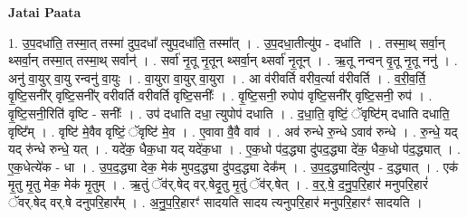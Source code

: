 \documentclass[17pt]{extarticle}
\begin{document}
\textbf{Jatai Paata} \newline

1. उ॒प॒दधा॑ति॒ तस्मा॒त् तस्मा॑ दुप॒दधा᳚ त्युप॒दधा॑ति॒ तस्मा᳚त् । . उ॒प॒दधा॒तीत्यु॑प - दधा॑ति । . तस्मा॒थ् सर्वा॒न् थ्सर्वा॒न् तस्मा॒त् तस्मा॒थ् सर्वान्॑ । . सर्वा॑ नृ॒तू नृ॒तून् थ्सर्वा॒न् थ्सर्वा॑ नृ॒तून् । . ऋ॒तू नन्वन् वृ॒तू नृ॒तू ननु॑ । . अनु॑ वा॒युर् वा॒यु रन्वनु॑ वा॒युः । . वा॒युरा वा॒युर् वा॒युरा । . आ व॑रीवर्ति वरीव॒र्त्या व॑रीवर्ति । . व॒री॒व॒र्ति॒ वृ॒ष्टि॒सनी᳚र् वृष्टि॒सनी᳚र् वरीवर्ति वरीवर्ति वृष्टि॒सनीः᳚ । . वृ॒ष्टि॒सनी॒ रुपोप॑ वृष्टि॒सनी᳚र् वृष्टि॒सनी॒ रुप॑ । . वृ॒ष्टि॒सनी॒रिति॑ वृष्टि - सनीः᳚ । . उप॑ दधाति दधा॒ त्युपोप॑ दधाति । . द॒धा॒ति॒ वृष्टिं॒ ॅवृष्टि॑म् दधाति दधाति॒ वृष्टि᳚म् । . वृष्टि॑ मे॒वैव वृष्टिं॒ ॅवृष्टि॑ मे॒व । . ए॒वावा वै॒वै वाव॑ । . अव॑ रुन्धे रु॒न्धे ऽवाव॑ रुन्धे । . रु॒न्धे॒ यद् यद् रु॑न्धे रुन्धे॒ यत् । . यदे॑क॒ धैक॒धा यद् यदे॑क॒धा । . ए॒क॒धो प॑द॒द्ध्या दु॑पद॒द्ध्या दे॑क॒ धैक॒धो प॑द॒द्ध्यात् । . ए॒क॒धेत्ये॑क - धा । . उ॒प॒द॒द्ध्या देक॒ मेक॑ मुपद॒द्ध्या दु॑पद॒द्ध्या देक᳚म् । . उ॒प॒द॒द्ध्यादित्यु॑प - द॒द्ध्यात् । . एक॑ मृ॒तु मृ॒तु मेक॒ मेक॑ मृ॒तुम् । . ऋ॒तुं ॅव॑र्.षेद् वर्.षेदृ॒तु मृ॒तुं ॅव॑र्.षेत् । . व॒र्॒.षे॒ द॒नु॒प॒रि॒हार॑ मनुपरि॒हारं॑ ॅवर्.षेद् वर्.षे दनुपरि॒हार᳚म् । . अ॒नु॒प॒रि॒हारꣳ॑ सादयति सादय त्यनुपरि॒हार॑ मनुपरि॒हारꣳ॑ सादयति । \newline
\end{document}
